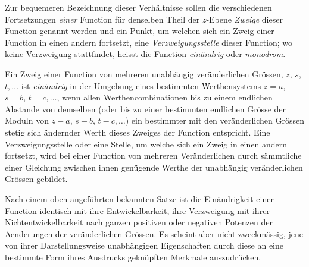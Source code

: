 \documentclass[a4paper,12pt,leqno]{article}
\begin{document}
Zur bequemeren Bezeichnung dieser Verh\"{a}ltnisse sollen die
verschiedenen Fortsetzungen \emph{einer} Function f\"{u}r
denselben Theil der $z$-Ebene \emph{Zweige} dieser Function
genannt werden und ein Punkt, um welchen sich ein Zweig einer
Function in einen andern fortsetzt, eine
\emph{Verzweigungsstelle} dieser Function; wo keine Verzweigung
stattfindet, heisst die Function \emph{ein\"{a}ndrig} oder
\emph{monodrom}.

Ein Zweig einer Function von mehreren unabh\"{a}ngig
ver\"{a}nderlichen Gr\"{o}ssen, $z$, $s$, $t,\ldots$ ist
\emph{ein\"{a}ndrig} in der Umgebung eines bestimmten
Werthensystems
$z = a$, $s = b$, $t = c,\ldots$,
wenn allen Werthencombinationen bis zu einem endlichen Abstande
von demselben (oder bis zu einer bestimmten endlichen Gr\"{o}sse
der Moduln von
$z - a$, $s - b$, $t - c,\ldots$)
ein bestimmter mit den ver\"{a}nderlichen Gr\"{o}ssen stetig sich
\"{a}ndernder Werth dieses Zweiges der Function entspricht.  Eine
Verzweigungsstelle oder eine Stelle, um welche sich ein Zweig in
einen andern fortsetzt, wird bei einer Function von mehreren
Ver\"{a}nderlichen durch s\"{a}mmtliche einer Gleichung zwischen
ihnen gen\"{u}gende Werthe der unabh\"{a}ngig ver\"{a}nderlichen
Gr\"{o}ssen gebildet.

Nach einem oben angef\"{u}hrten bekannten Satze ist die
Ein\"{a}ndrigkeit einer Function identisch mit ihre
Entwickelbarkeit, ihre Verzweigung mit ihrer
Nichtentwickelbarkeit nach ganzen positiven oder negativen
Potenzen der Aenderungen der ver\"{a}nderlichen Gr\"{o}ssen.  Es
scheint aber nicht zweckm\"{a}ssig, jene von ihrer
Darstellungsweise unabh\"{a}ngigen Eigenschaften durch diese an
eine bestimmte Form ihres Ausdrucks gekn\"{u}pften Merkmale
auszudr\"{u}cken.
\end{document}
